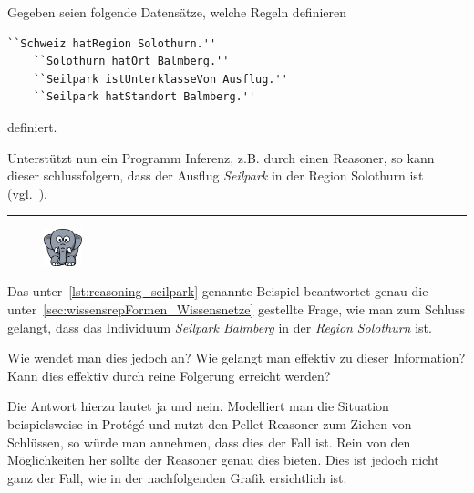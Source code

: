 Gegeben seien folgende Datensätze, welche Regeln definieren

\begin{lstlisting}[caption={Aussagentripel bestehend aus Objekt, Prädikat und Subjekt},captionpos=b,label=lst:reasoning_seilpark]
    ``Schweiz hatRegion Solothurn.''
    ``Solothurn hatOrt Balmberg.''
    ``Seilpark istUnterklasseVon Ausflug.''
    ``Seilpark hatStandort Balmberg.''
\end{lstlisting}

definiert.

Unterstützt nun ein Programm Inferenz, z.B. durch einen Reasoner, so kann dieser schlussfolgern, dass der Ausflug \textit{Seilpark} in der Region Solothurn ist (vgl.~\cite[Abschnitt `Examples']{w3inference}).

\newpage

\noindent\rule[1ex]{\textwidth}{1pt}
\begin{figure}
    \vspace{-12pt}
    \includegraphics[width=0.1\textwidth]{bilder/elephant.png}
\end{figure}
Das unter~\ref{lst:reasoning_seilpark} genannte Beispiel beantwortet genau die unter~\ref{sec:wissensrepFormen_Wissensnetze} gestellte Frage, wie man zum Schluss gelangt, dass das Individuum \textit{Seilpark Balmberg} in der \textit{Region} \textit{Solothurn} ist.

Wie wendet man dies jedoch an? Wie gelangt man effektiv zu dieser Information? Kann dies effektiv durch reine Folgerung erreicht werden?

Die Antwort hierzu lautet ja und nein. Modelliert man die Situation beispielsweise in Protégé und nutzt den Pellet-Reasoner zum Ziehen von Schlüssen, so würde man annehmen, dass dies der Fall ist. Rein von den Möglichkeiten her sollte der Reasoner genau dies bieten. Dies ist jedoch nicht ganz der Fall, wie in der nachfolgenden Grafik ersichtlich ist.

